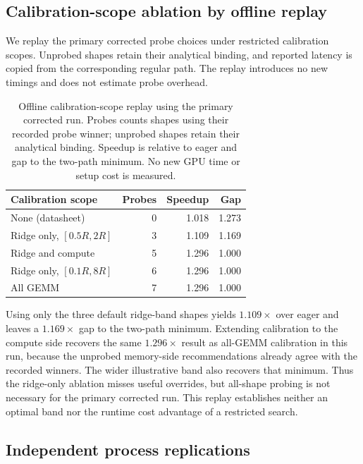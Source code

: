 \documentclass[a4paper,fleqn]{cas-dc}
\begin{document}
\subsection{Calibration-scope ablation by offline replay}
\label{sec:scope}

We replay the primary corrected probe choices under restricted calibration scopes.
Unprobed shapes retain their analytical binding, and reported latency is copied from the corresponding regular path.
The replay introduces no new timings and does not estimate probe overhead.


\begin{table}[t]
  \centering
  \caption{Offline calibration-scope replay using the primary corrected run. Probes counts shapes using their recorded probe winner; unprobed shapes retain their analytical binding. Speedup is relative to eager and gap to the two-path minimum. No new GPU time or setup cost is measured.}
  \label{tab:scope}
  \footnotesize
  \setlength{\tabcolsep}{3pt}
  \begin{tabular}{@{}lrrr@{}}
    \toprule
    Calibration scope & Probes & Speedup & Gap \\
    \midrule
    None (datasheet) & 0 & 1.018 & 1.273 \\
    Ridge only, $[0.5R,2R]$ & 3 & 1.109 & 1.169 \\
    Ridge and compute & 5 & 1.296 & 1.000 \\
    Ridge only, $[0.1R,8R]$ & 6 & 1.296 & 1.000 \\
    All GEMM & 7 & 1.296 & 1.000 \\
    \bottomrule
  \end{tabular}
\end{table}

Using only the three default ridge-band shapes yields $1.109\times$ over eager and leaves a $1.169\times$ gap to the two-path minimum.
Extending calibration to the compute side recovers the same $1.296\times$ result as all-GEMM calibration in this run, because the unprobed memory-side recommendations already agree with the recorded winners.
The wider illustrative band also recovers that minimum.
Thus the ridge-only ablation misses useful overrides, but all-shape probing is not necessary for the primary corrected run.
This replay establishes neither an optimal band nor the runtime cost advantage of a restricted search.

\subsection{Independent process replications}
\label{sec:replication}
\end{document}
